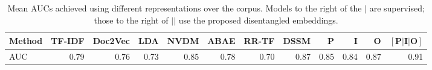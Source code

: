 \documentclass[11pt,a4paper]{article}
\begin{document}
\begin{table}%
\small
\centering
\begin{tabular}{l r r r r r|r r || r r r r}
\hline
Method &  TF-IDF &  Doc2Vec&  LDA &  NVDM &  ABAE&  RR-TF &  DSSM & $\mathbf{P}$ & $\mathbf{I}$ & $\mathbf{O}$ & $\mathbf{[P|I|O]}$ \\ 
\hline
AUC & 0.79 & 	0.76 & 	0.73 & 	0.85 & 	0.78 & 	0.70 & 	0.87 & 	0.85 & 	0.84 & 	0.87 & 	0.91
\end{tabular}
\vspace{-.65em}
\caption{Mean AUCs achieved using different representations over the  corpus. Models to the right of the $\vert$ are supervised; those to the right of $\vert \vert$ use the proposed disentangled embeddings. } 
\label{table:cohenauc}
\end{table}
\end{document}
